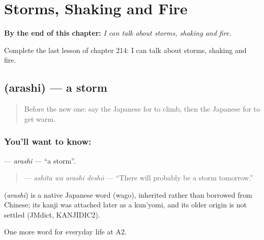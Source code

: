 
\chapter{Storms, Shaking and Fire}
\label{ch:ja-storms-shaking-and-fire}

\begin{chapteropening}
\textbf{By the end of this chapter:} \emph{I can talk about storms, shaking and fire.}

Complete the last lesson of chapter 214: I can talk about storms, shaking and fire.
\end{chapteropening}

\section[\texorpdfstring{\ja{あらし} (arashi)}{あらし (arashi)}]{ (arashi) — a storm}

\label{lesson:JA-C214-arashi}



\begin{quote}
Before the new one: say the Japanese for to climb, then the Japanese for to get warm.
\end{quote}

\subsection*{You'll want to know: }
\textbf{} — \emph{arashi} — \textquotedblleft{}a storm\textquotedblright{}.

\begin{quote}
\textbf{ } — \emph{ashita wa arashi deshō} — \textquotedblleft{}There will probably be a storm tomorrow.\textquotedblright{}
\end{quote}

\begin{cousinweb}
\textbf{} (\emph{arashi}) is a native Japanese word (wago), inherited rather than borrowed from Chinese; its kanji was attached later as a kun'yomi, and its older origin is not settled (JMdict, KANJIDIC2).
\end{cousinweb}

\begin{grammarlens}[title={What you've built}]
One more word for everyday life at A2.
\end{grammarlens}

